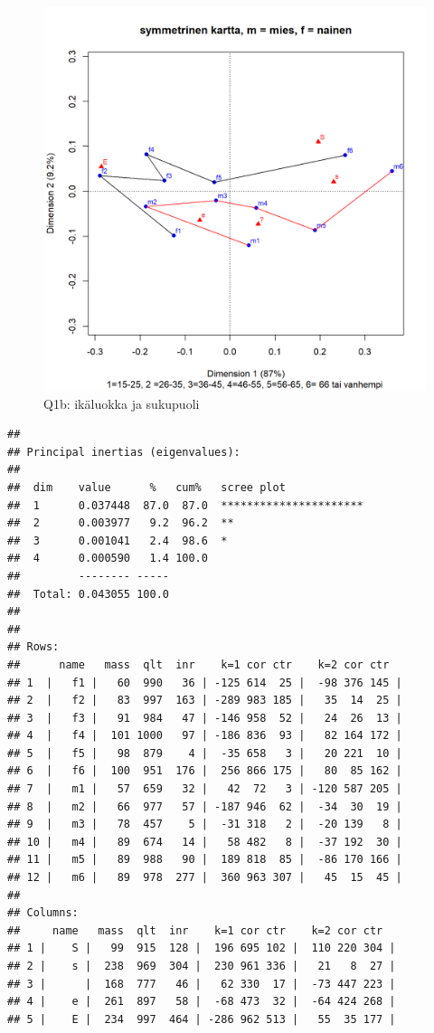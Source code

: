 \documentclass[
  finnish,
]{book}
\begin{document}
\begin{figure}

{\centering \includegraphics[width=0.9\linewidth]{JH_capaper_files/figure-latex/gaCA1map-1} 

}

\caption{Q1b: ikäluokka ja sukupuoli}\label{fig:gaCA1map}
\end{figure}

\begin{verbatim}
## 
## Principal inertias (eigenvalues):
## 
##  dim    value      %   cum%   scree plot               
##  1      0.037448  87.0  87.0  **********************   
##  2      0.003977   9.2  96.2  **                       
##  3      0.001041   2.4  98.6  *                        
##  4      0.000590   1.4 100.0                           
##         -------- -----                                 
##  Total: 0.043055 100.0                                 
## 
## 
## Rows:
##      name   mass  qlt  inr    k=1 cor ctr    k=2 cor ctr  
## 1  |   f1 |   60  990   36 | -125 614  25 |  -98 376 145 |
## 2  |   f2 |   83  997  163 | -289 983 185 |   35  14  25 |
## 3  |   f3 |   91  984   47 | -146 958  52 |   24  26  13 |
## 4  |   f4 |  101 1000   97 | -186 836  93 |   82 164 172 |
## 5  |   f5 |   98  879    4 |  -35 658   3 |   20 221  10 |
## 6  |   f6 |  100  951  176 |  256 866 175 |   80  85 162 |
## 7  |   m1 |   57  659   32 |   42  72   3 | -120 587 205 |
## 8  |   m2 |   66  977   57 | -187 946  62 |  -34  30  19 |
## 9  |   m3 |   78  457    5 |  -31 318   2 |  -20 139   8 |
## 10 |   m4 |   89  674   14 |   58 482   8 |  -37 192  30 |
## 11 |   m5 |   89  988   90 |  189 818  85 |  -86 170 166 |
## 12 |   m6 |   89  978  277 |  360 963 307 |   45  15  45 |
## 
## Columns:
##     name   mass  qlt  inr    k=1 cor ctr    k=2 cor ctr  
## 1 |    S |   99  915  128 |  196 695 102 |  110 220 304 |
## 2 |    s |  238  969  304 |  230 961 336 |   21   8  27 |
## 3 |      |  168  777   46 |   62 330  17 |  -73 447 223 |
## 4 |    e |  261  897   58 |  -68 473  32 |  -64 424 268 |
## 5 |    E |  234  997  464 | -286 962 513 |   55  35 177 |
\end{verbatim}
\end{document}

